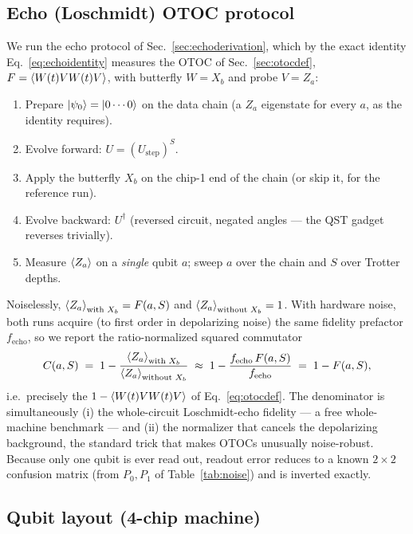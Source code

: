 \documentclass[11pt]{article}
\begin{document}
\subsection{Echo (Loschmidt) OTOC protocol}

We run the echo protocol of Sec.~\ref{sec:echoderivation}, which by the exact
identity Eq.~\eqref{eq:echoidentity} measures the OTOC of
Sec.~\ref{sec:otocdef}, $F = \expval{W(t)VW(t)V}$, with butterfly $W=X_b$ and
probe $V=Z_a$:
\begin{enumerate}
  \item Prepare $\ket{\psi_0} = \ket{0\cdots0}$ on the data chain (a $Z_a$
        eigenstate for every $a$, as the identity requires).
  \item Evolve forward: $U = (U_{\mathrm{step}})^S$.
  \item Apply the butterfly $X_b$ on the chip-1 end of the chain
        (or skip it, for the reference run).
  \item Evolve backward: $U^\dagger$ (reversed circuit, negated angles ---
        the QST gadget reverses trivially).
  \item Measure $\expval{Z_a}$ on a \emph{single} qubit $a$; sweep $a$ over the
        chain and $S$ over Trotter depths.
\end{enumerate}
Noiselessly, $\expval{Z_a}_{\text{with }X_b} = F(a,S)$ and
$\expval{Z_a}_{\text{without }X_b} = 1$. With hardware noise, both runs
acquire (to first order in depolarizing noise) the same fidelity prefactor
$f_{\mathrm{echo}}$, so we report the ratio-normalized squared commutator
\begin{equation}
  C(a, S) \;=\; 1 - \frac{\expval{Z_a}_{\text{with }X_b}}
                         {\expval{Z_a}_{\text{without }X_b}}
  \;\approx\; 1 - \frac{f_{\mathrm{echo}}\, F(a,S)}{f_{\mathrm{echo}}}
  \;=\; 1 - F(a,S) ,
\label{eq:normalized}
\end{equation}
i.e.\ precisely the $1 - \expval{W(t)VW(t)V}$ of Eq.~\eqref{eq:otocdef}. The
denominator is simultaneously (i) the whole-circuit Loschmidt-echo fidelity
--- a free whole-machine benchmark --- and (ii) the normalizer that cancels
the depolarizing background, the standard trick that makes OTOCs unusually
noise-robust. Because only one qubit is ever read out, readout error reduces
to a known $2\times2$ confusion matrix (from $P_0, P_1$ of
Table~\ref{tab:noise}) and is inverted exactly.

\subsection{Qubit layout (4-chip machine)}
\end{document}
